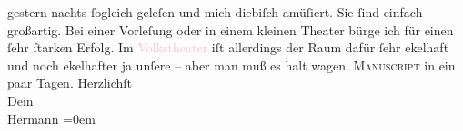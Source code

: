                gestern nachts ſogleich geleſen und mich diebiſch amüſiert. Sie ſind einfach
               großartig. Bei einer Vorleſung oder in einem kleinen Theater bürge ich für einen ſehr
               ſtarken Erfolg. Im \textcolor{pink}{Volkstheater}{}\ledrightnote{\textcolor{pink}{Volkstheater}} iſt allerdings der
               Raum dafür ſehr ekelhaft und noch ekelhafter ja unſere \label{K_L01093_2v}\label{K_L01093_2h} – aber man muß es halt wagen. \textsc{Manuscript} in ein paar Tagen.\pend
           \pstart
           Herzlichſt{\\[\baselineskip]}Dein{\\[\baselineskip]}\spacefill\mbox{Hermann}\pend
           \leftskip=0em{}\endnumbering{}  
      